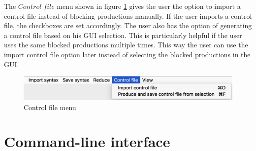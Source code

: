 The $Control\;file$ menu shown in figure \ref{fig:ControlFileMenu} gives the user the option to import a control file instead of blocking productions manually. If the user imports a control file, the checkboxes are set accordingly.
The user also has the option of generating a control file based on his GUI selection. This is particularly helpful if the user uses the same blocked productions multiple times. This way the user can use the import control file option later instead of selecting the blocked productions in the GUI.

\begin{figure}[H]
\centering
\includegraphics[width=.7\textwidth]{images/control_file_menu.png}
\caption{Control file menu}
\label{fig:ControlFileMenu}
\end{figure}

\section{Command-line interface}\label{sec:ConceptCommandLineInterface}

